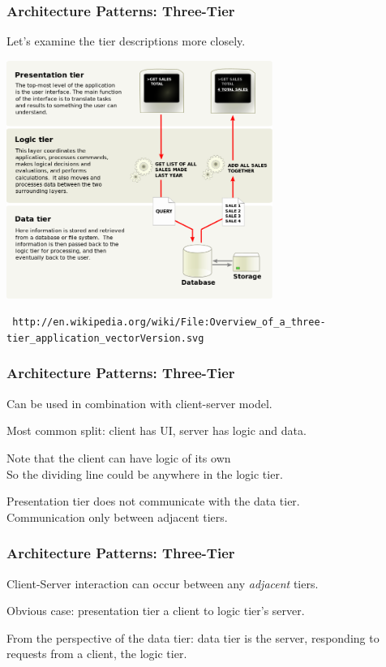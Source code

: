 \begin{frame}
\frametitle{Architecture Patterns: Three-Tier}

Let's examine the tier descriptions more closely.

\begin{center}
	\includegraphics[width=0.65\textwidth]{images/threetier.png}
	
	\texttt{\tiny
 http://en.wikipedia.org/wiki/File:Overview\_of\_a\_three-tier\_application\_vectorVersion.svg}
\end{center}

\end{frame}

\begin{frame}
\frametitle{Architecture Patterns: Three-Tier}

\begin{changemargin}{1cm}
Can be used in combination with client-server model.

Most common split: client has UI, server has logic and data.

Note that the client can have logic of its own\\
\quad So the dividing line could be anywhere in the logic tier.

Presentation tier does not communicate with the data tier.\\
\quad Communication only between adjacent tiers.

\end{changemargin}
\end{frame}

\begin{frame}
\frametitle{Architecture Patterns: Three-Tier}

\begin{changemargin}{1cm}
Client-Server interaction can occur between any \textit{adjacent} tiers.

Obvious case: presentation tier a client to logic tier's server.

From the perspective of the data tier: data tier is the server, responding to requests from a client, the logic tier.

\end{changemargin}
\end{frame}

